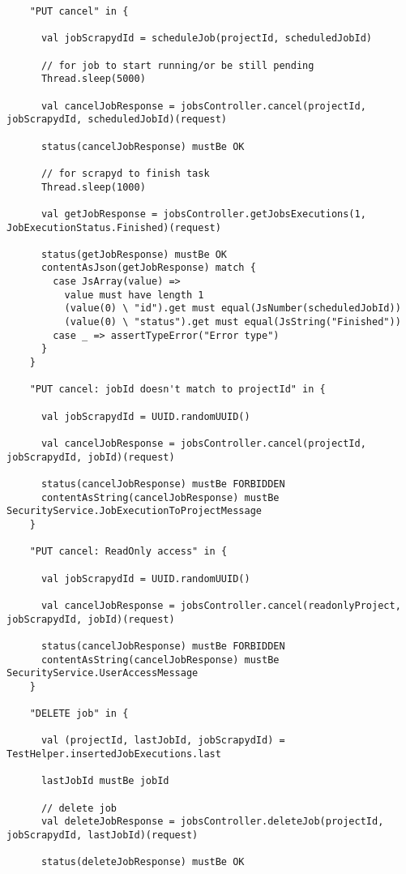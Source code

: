 \begin{lstlisting}
    "PUT cancel" in {

      val jobScrapydId = scheduleJob(projectId, scheduledJobId)

      // for job to start running/or be still pending
      Thread.sleep(5000)

      val cancelJobResponse = jobsController.cancel(projectId, jobScrapydId, scheduledJobId)(request)

      status(cancelJobResponse) mustBe OK

      // for scrapyd to finish task
      Thread.sleep(1000)

      val getJobResponse = jobsController.getJobsExecutions(1, JobExecutionStatus.Finished)(request)

      status(getJobResponse) mustBe OK
      contentAsJson(getJobResponse) match {
        case JsArray(value) =>
          value must have length 1
          (value(0) \ "id").get must equal(JsNumber(scheduledJobId))
          (value(0) \ "status").get must equal(JsString("Finished"))
        case _ => assertTypeError("Error type")
      }
    }

    "PUT cancel: jobId doesn't match to projectId" in {

      val jobScrapydId = UUID.randomUUID()

      val cancelJobResponse = jobsController.cancel(projectId, jobScrapydId, jobId)(request)

      status(cancelJobResponse) mustBe FORBIDDEN
      contentAsString(cancelJobResponse) mustBe SecurityService.JobExecutionToProjectMessage
    }

    "PUT cancel: ReadOnly access" in {

      val jobScrapydId = UUID.randomUUID()

      val cancelJobResponse = jobsController.cancel(readonlyProject, jobScrapydId, jobId)(request)

      status(cancelJobResponse) mustBe FORBIDDEN
      contentAsString(cancelJobResponse) mustBe SecurityService.UserAccessMessage
    }

    "DELETE job" in {

      val (projectId, lastJobId, jobScrapydId) = TestHelper.insertedJobExecutions.last

      lastJobId mustBe jobId

      // delete job
      val deleteJobResponse = jobsController.deleteJob(projectId, jobScrapydId, lastJobId)(request)

      status(deleteJobResponse) mustBe OK


\end{lstlisting}
